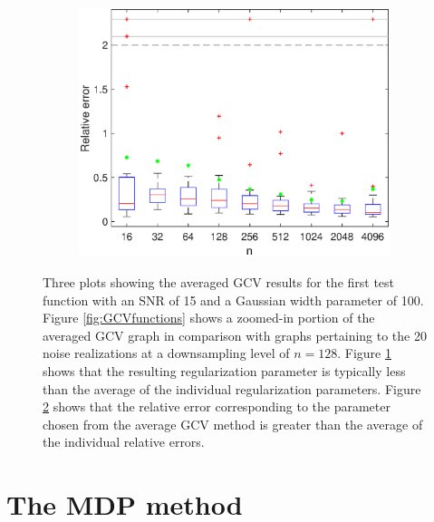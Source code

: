 \documentclass[12pt]{book}
\begin{document}
\begin{figure}
\begin{subfigure}[b]{0.45\textwidth}
        \label{fig:GCVlambdas}
    \end{subfigure}
    \begin{subfigure}[b]{0.45\textwidth}
        \includegraphics[width=\textwidth]{Figures/GCV_ErrPlot1D_F1_S15_W100_R20.eps}
        \caption{}
        \label{fig:GCVerrors}
    \end{subfigure}
    \caption{Three plots showing the averaged GCV results for the first test function with an SNR of 15 and a Gaussian width parameter of 100. Figure \ref{fig:GCVfunctions} shows a zoomed-in portion of the averaged GCV graph in comparison with graphs pertaining to the 20 noise realizations at a downsampling level of $n = 128$. Figure \ref{fig:GCVlambdas} shows that the resulting regularization parameter is typically less than the average of the individual regularization parameters. Figure \ref{fig:GCVerrors} shows that the relative error corresponding to the parameter chosen from the average GCV method is greater than the average of the individual relative errors.}
\label{fig:GCVplots}
\end{figure}

\section{The MDP method} \label{The MDP method}
\end{document}
